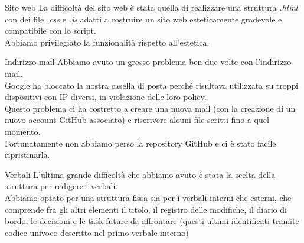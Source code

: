 \documentclass[11pt]{beamer}
\begin{document}
\begin{frame}{Sito web}
	La difficoltà del sito web è stata quella di realizzare una struttura \textit{.html} con dei file \textit{.css} e \textit{.js} adatti a costruire un sito web esteticamente gradevole e compatibile con lo script.\\
	Abbiamo privilegiato la funzionalità rispetto all’estetica.
\end{frame}

\begin{frame}{Indirizzo mail}
	Abbiamo avuto un grosso problema ben due volte con l'indirizzo mail.\\
	Google ha bloccato la nostra casella di posta perché risultava utilizzata su troppi dispositivi con IP diversi, in violazione delle loro policy.\\
	Questo problema ci ha costretto a creare una nuova mail (con la creazione di un nuovo account GitHub associato) e riscrivere alcuni file scritti fino a quel momento.\\
	Fortunatamente non abbiamo perso la repository GitHub e ci è stato facile ripristinarla.
\end{frame}

\begin{frame}{Verbali}
	L'ultima grande difficoltà che abbiamo avuto è stata la scelta della struttura per redigere i verbali.\\
	Abbiamo optato per una struttura fissa sia per i verbali interni che esterni, che comprende fra gli altri elementi il titolo, il registro delle modifiche, il diario di bordo, le decisioni e le task future da affrontare (questi ultimi identificati tramite codice univoco descritto nel primo verbale interno)
\end{frame}
\end{document}
